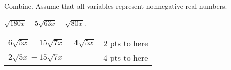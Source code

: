 
{
	Combine. Assume that all variables represent nonnegative real numbers. 
	
	\noindent $\displaystyle \sqrt{180x}-5\sqrt{63x}-\sqrt{80x}$.
}
{
	\begin{tabular}{l r}
	$6\sqrt{5x}-15\sqrt{7x}-4\sqrt{5x}$ & 2 pts to here\\
	$2\sqrt{5x}-15\sqrt{7x}$ & 4 pts to here
	\end{tabular}
}
